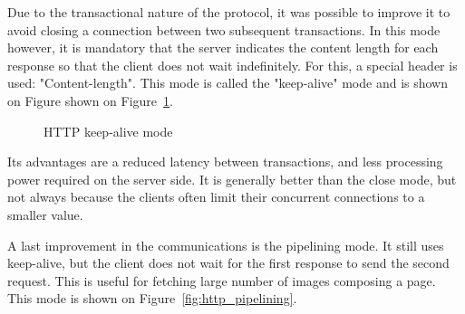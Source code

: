 Due to the transactional nature of the protocol, it was possible to improve it
to avoid closing a connection between two subsequent transactions. In this mode
however, it is mandatory that the server indicates the content length for each
response so that the client does not wait indefinitely. For this, a special
header is used: "Content-length". This mode is called the "keep-alive" mode
and is shown on Figure shown on Figure~\ref{fig:http_keep_alive}.


\begin{figure}[!h]
\centering
{}

\caption{HTTP keep-alive mode}
\label{fig:http_keep_alive}
\end{figure}

Its advantages are a reduced latency between transactions, and less processing
power required on the server side. It is generally better than the close mode,
but not always because the clients often limit their concurrent connections to
a smaller value.

A last improvement in the communications is the pipelining mode. It still uses
keep-alive, but the client does not wait for the first response to send the
second request. This is useful for fetching large number of images composing a
page. This mode is shown on Figure~\ref{fig:http_pipelining}.

